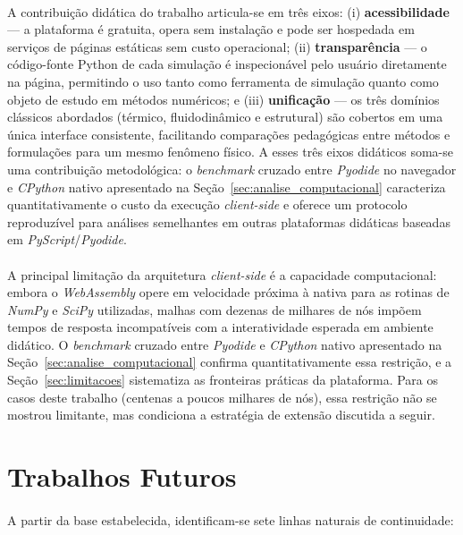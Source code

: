 \paragraph{}A contribuição didática do trabalho articula-se em três eixos: (i) \textbf{acessibilidade} --- a plataforma é gratuita, opera sem instalação e pode ser hospedada em serviços de páginas estáticas sem custo operacional; (ii) \textbf{transparência} --- o código-fonte Python de cada simulação é inspecionável pelo usuário diretamente na página, permitindo o uso tanto como ferramenta de simulação quanto como objeto de estudo em métodos numéricos; e (iii) \textbf{unificação} --- os três domínios clássicos abordados (térmico, fluidodinâmico e estrutural) são cobertos em uma única interface consistente, facilitando comparações pedagógicas entre métodos e formulações para um mesmo fenômeno físico. A esses três eixos didáticos soma-se uma contribuição metodológica: o \textit{benchmark} cruzado entre \textit{Pyodide} no navegador e \textit{CPython} nativo apresentado na Seção~\ref{sec:analise_computacional} caracteriza quantitativamente o custo da execução \textit{client-side} e oferece um protocolo reproduzível para análises semelhantes em outras plataformas didáticas baseadas em \textit{PyScript}/\textit{Pyodide}.

\paragraph{}A principal limitação da arquitetura \textit{client-side} é a capacidade computacional: embora o \textit{WebAssembly} opere em velocidade próxima à nativa para as rotinas de \textit{NumPy} e \textit{SciPy} utilizadas, malhas com dezenas de milhares de nós impõem tempos de resposta incompatíveis com a interatividade esperada em ambiente didático. O \textit{benchmark} cruzado entre \textit{Pyodide} e \textit{CPython} nativo apresentado na Seção~\ref{sec:analise_computacional} confirma quantitativamente essa restrição, e a Seção~\ref{sec:limitacoes} sistematiza as fronteiras práticas da plataforma. Para os casos deste trabalho (centenas a poucos milhares de nós), essa restrição não se mostrou limitante, mas condiciona a estratégia de extensão discutida a seguir.

\section{Trabalhos Futuros}

\paragraph{}A partir da base estabelecida, identificam-se sete linhas naturais de continuidade:

